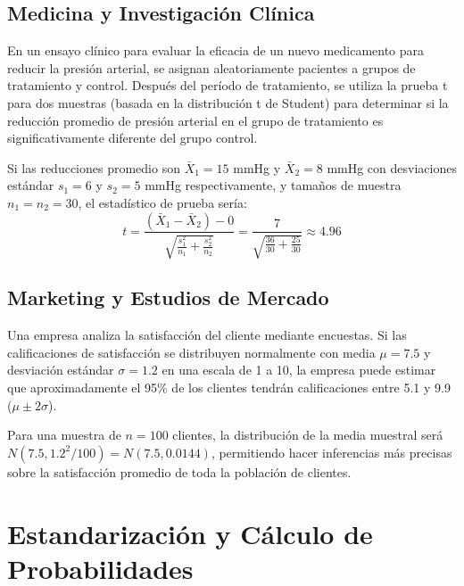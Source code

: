 \subsection{Medicina y Investigación Clínica}

\begin{example}
En un ensayo clínico para evaluar la eficacia de un nuevo medicamento para reducir la presión arterial, se asignan aleatoriamente pacientes a grupos de tratamiento y control. Después del período de tratamiento, se utiliza la prueba t para dos muestras (basada en la distribución t de Student) para determinar si la reducción promedio de presión arterial en el grupo de tratamiento es significativamente diferente del grupo control.

Si las reducciones promedio son $\bar{X}_1 = 15$ mmHg y $\bar{X}_2 = 8$ mmHg con desviaciones estándar $s_1 = 6$ y $s_2 = 5$ mmHg respectivamente, y tamaños de muestra $n_1 = n_2 = 30$, el estadístico de prueba sería:
\begin{equation}
t = \frac{(\bar{X}_1 - \bar{X}_2) - 0}{\sqrt{\frac{s_1^2}{n_1} + \frac{s_2^2}{n_2}}} = \frac{7}{\sqrt{\frac{36}{30} + \frac{25}{30}}} \approx 4.96
\end{equation}
\end{example}

\subsection{Marketing y Estudios de Mercado}

\begin{example}
Una empresa analiza la satisfacción del cliente mediante encuestas. Si las calificaciones de satisfacción se distribuyen normalmente con media $\mu = 7.5$ y desviación estándar $\sigma = 1.2$ en una escala de 1 a 10, la empresa puede estimar que aproximadamente el 95\% de los clientes tendrán calificaciones entre 5.1 y 9.9 ($\mu \pm 2\sigma$).

Para una muestra de $n = 100$ clientes, la distribución de la media muestral será $N(7.5, 1.2^2/100) = N(7.5, 0.0144)$, permitiendo hacer inferencias más precisas sobre la satisfacción promedio de toda la población de clientes.
\end{example}

\section{Estandarización y Cálculo de Probabilidades}

